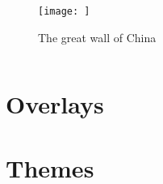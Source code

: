 \documentclass{beamer}
\begin{document}
\begin{frame}[t, fragile]
{\begin{columns}
						\begin{figure}[h]
							\centering
							\texttt{[image: ]}
							\caption{The great wall of China}
							\label{img:great-wall-of-china}
						\end{figure}
				\end{columns}
			}
		\end{frame}
	\section{Overlays}
	\section{Themes}
\end{document}

